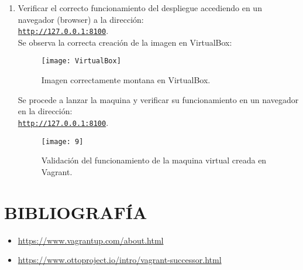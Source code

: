 \documentclass[10pt]{article}   			%
\begin{document}
\begin{enumerate}
\begin{small}
\begin{lstlisting}[frame=single]
	\end{lstlisting}
\end{small}

\item  Verificar el correcto funcionamiento del despliegue accediendo en un navegador (browser) a la dirección: \\
\href{http://127.0.0.1:8100}{\texttt{http://127.0.0.1:8100}}.\\

\newpage
Se observa la correcta creación de la imagen en VirtualBox: 

\begin{figure}[ht] 
	\centering
	\texttt{[image: VirtualBox]}   
	\caption{Imagen correctamente montana en VirtualBox.} 
\end{figure}

Se procede a lanzar la maquina y verificar su funcionamiento en un navegador en la dirección: \\
\href{http://127.0.0.1:8100}{\texttt{http://127.0.0.1:8100}}.\\

\begin{figure}[ht] 
	\centering
	\texttt{[image: 9]}   
	\caption{Validación del funcionamiento de la maquina virtual creada en Vagrant.} 
\end{figure}

\end{enumerate}
\section{BIBLIOGRAFÍA}
\begin{itemize}
	\item \href{https://www.vagrantup.com/about.html
		}{https://www.vagrantup.com/about.html
		}
	\item \href{https://www.ottoproject.io/intro/vagrant-successor.html	
		}{https://www.ottoproject.io/intro/vagrant-successor.html}
\end{itemize}
	
\end{document}
